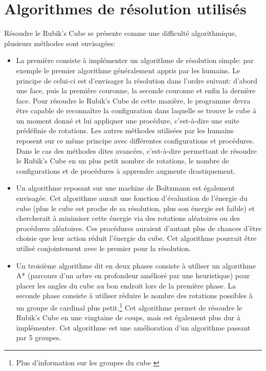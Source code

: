 \section{Algorithmes de résolution utilisés}
 Résoudre le Rubik's Cube se présente comme une difficulté algorithmique, plusieurs méthodes sont envisagées:
 \begin{itemize}
     \item La première consiste à implémenter un algorithme de résolution simple: par exemple le premier algorithme généralement appris par les humains.\cite{cite2} 
           Le principe de celui-ci est d'envisager la résolution dans l'ordre suivant: d'abord une face, puis la première couronne, la seconde couronne et enfin la dernière face\cite{cite2}. 
           Pour résoudre le Rubik's Cube de cette manière, le programme devra être capable de reconnaître la configuration dans laquelle se trouve le cube à un moment donné et lui appliquer une procédure, c'est-à-dire une suite prédéfinie de rotations. 
           Les autres méthodes utilisées par les humains reposent sur ce même principe avec différentes configurations et procédures. 
           Dans le cas des méthodes dites avancées, c'est-à-dire permettant de résoudre le Rubik's Cube  en un plus petit nombre de rotations, le nombre de configurations et de procédures à apprendre augmente drastiquement.
    \item Un algorithme reposant sur une machine de Boltzmann\cite{cite10} est également envisagée. Cet algorithme aurait une fonction d'évaluation de    l'énergie du cube (plus le cube est proche de sa résolution, plus son énergie est faible) et chercherait à minimiser cette énergie via des rotations  aléatoires ou des procédures aléatoires. Ces procédures auraient d'autant plus de chances d'être choisie que leur action réduit l'énergie du cube.    Cet algorithme pourrait être utilisé conjointement avec le premier pour la résolution.
    \item Un troisième algorithme dit en deux phases consiste à utiliser un algorithme A*\cite{cite3} (parcours d'un arbre en profondeur amélioré par     une heuristique) pour placer les angles du cube au bon endroit lors de la première phase. La seconde phase consiste à utiliser réduire le nombre des  rotations possibles à un groupe de cardinal plus petit.\footnote{Plus d'information sur les groupes du cube \cite{cite12}} Cet algorithme permet de   résoudre le Rubik's Cube en une vingtaine de
        coups, mais est également plus dur à implémenter\cite{cite0}. Cet algorithme est une amélioration d'un algorithme passant par 5 groupes\cite{cite4}.
 \end{itemize}

